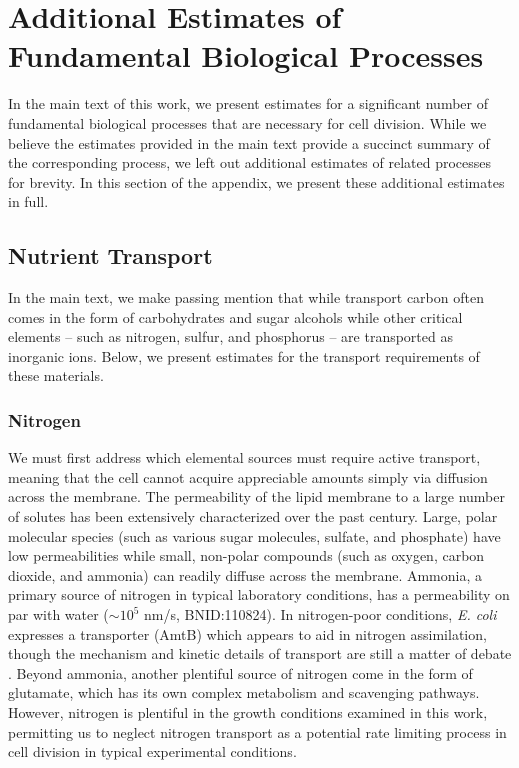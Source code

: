 \section{Additional Estimates of Fundamental Biological Processes}
\label{sec:SI_nutr_trans}

In the main text of this work, we present estimates for a significant number of
fundamental biological processes that are necessary for cell division. While we
believe the estimates provided in the main text provide a succinct summary of
the corresponding process, we left out additional estimates of related
processes for brevity. In this section of the appendix, we present these
additional estimates in full.


\subsection{Nutrient Transport}
In the main text, we make passing mention that while transport carbon often
comes in the form of carbohydrates and sugar alcohols while other critical
elements -- such as nitrogen, sulfur, and phosphorus -- are transported as
inorganic ions. Below, we present estimates for the transport requirements of
these materials.

\subsubsection{Nitrogen}
We must first address which elemental sources must require active transport,
meaning that the cell cannot acquire appreciable amounts simply via diffusion
across the membrane. The permeability of the lipid membrane to a large number
of solutes has been extensively characterized over the past century. Large,
polar molecular species (such as various sugar molecules, sulfate, and
phosphate) have low permeabilities while small, non-polar compounds (such as
oxygen, carbon dioxide, and ammonia) can readily diffuse across the membrane.
Ammonia, a primary source of nitrogen in typical laboratory conditions, has a
permeability on par with water ($\sim 10^5$ nm/s, BNID:110824). In
nitrogen-poor conditions, \textit{E. coli} expresses a transporter (AmtB)
which appears to aid in nitrogen assimilation, though the mechanism and
kinetic details of transport are still a matter of debate
\citep{heeswijk2013a, khademi2004}. Beyond ammonia, another plentiful source
of nitrogen come in the form of glutamate, which has its own complex
metabolism and scavenging pathways. However, nitrogen is plentiful in the
growth conditions examined in this work, permitting us to neglect nitrogen
transport as a potential rate limiting process in cell division in typical
experimental conditions.

